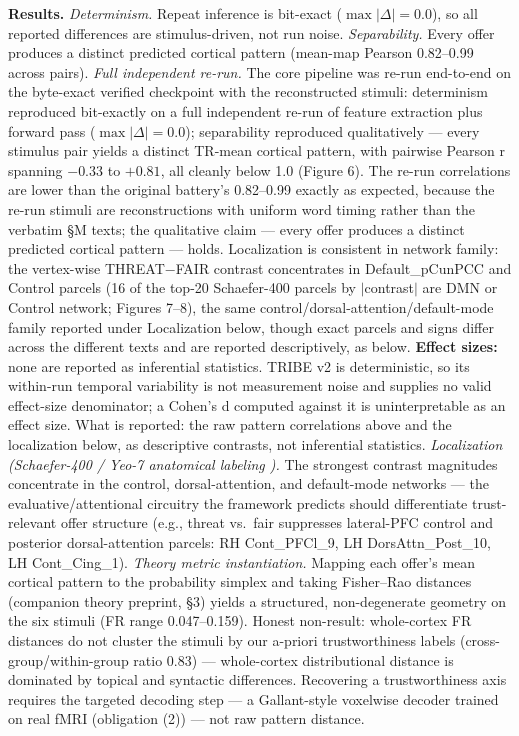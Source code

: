 \documentclass[
]{article}
\newcounter{none} %
\begin{document}
\textbf{Results.} \emph{Determinism.} Repeat inference is bit-exact
(\(\max |\Delta| = 0.0\)), so all reported differences are
stimulus-driven, not run noise. \emph{Separability.} Every offer
produces a distinct predicted cortical pattern (mean-map Pearson
0.82--0.99 across pairs). \emph{Full independent re-run.} The core
pipeline was re-run end-to-end on the byte-exact verified checkpoint
with the reconstructed stimuli: determinism reproduced bit-exactly on a
full independent re-run of feature extraction plus forward pass
(\(\max |\Delta| = 0.0\)); separability reproduced qualitatively ---
every stimulus pair yields a distinct TR-mean cortical pattern, with
pairwise Pearson r spanning \(-0.33\) to \(+0.81\), all cleanly below
1.0 (Figure 6). The re-run correlations are lower than the original
battery's 0.82--0.99 exactly as expected, because the re-run stimuli are
reconstructions with uniform word timing rather than the verbatim §M
texts; the qualitative claim --- every offer produces a distinct
predicted cortical pattern --- holds. Localization is consistent in
network family: the vertex-wise THREAT\(-\)FAIR contrast concentrates in
Default\_pCunPCC and Control parcels (16 of the top-20 Schaefer-400
parcels by \(|\)contrast\(|\) are DMN or Control network; Figures 7--8),
the same control/dorsal-attention/default-mode family reported under
Localization below, though exact parcels and signs differ across the
different texts and are reported descriptively, as below. \textbf{Effect
sizes:} none are reported as inferential statistics. TRIBE v2 is
deterministic, so its within-run temporal variability is not measurement
noise and supplies no valid effect-size denominator; a Cohen's d
computed against it is uninterpretable as an effect size. What is
reported: the raw pattern correlations above and the localization below,
as descriptive contrasts, not inferential statistics. \emph{Localization
(Schaefer-400 / Yeo-7 anatomical labeling ).} The strongest contrast
magnitudes concentrate in the control, dorsal-attention, and
default-mode networks --- the evaluative/attentional circuitry the
framework predicts should differentiate trust-relevant offer structure
(e.g., threat vs.~fair suppresses lateral-PFC control and posterior
dorsal-attention parcels: RH Cont\_PFCl\_9, LH DorsAttn\_Post\_10, LH
Cont\_Cing\_1). \emph{Theory metric instantiation.} Mapping each offer's
mean cortical pattern to the probability simplex and taking Fisher--Rao
distances (companion theory preprint, §3) yields a structured,
non-degenerate geometry on the six stimuli (FR range 0.047--0.159).
Honest non-result: whole-cortex FR distances do not cluster the stimuli
by our a-priori trustworthiness labels (cross-group/within-group ratio
0.83) --- whole-cortex distributional distance is dominated by topical
and syntactic differences. Recovering a trustworthiness axis requires
the targeted decoding step --- a Gallant-style voxelwise decoder trained
on real fMRI (obligation (2)) --- not raw pattern distance.
\end{document}
